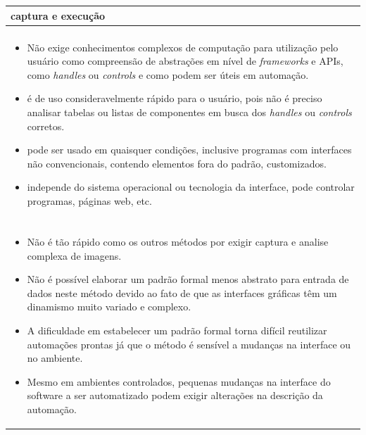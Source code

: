 \documentclass[tg]{mdtufsm}
\begin{document}
{                \begin{tabularx}{\textwidth}{|*{1}{>{\centering\arraybackslash}X}|}
                    \hline
                    captura e execução \\
                    \hline
                    {\bf prós:} \\
                    \begin{itemize}
                        \item Não exige conhecimentos complexos de computação para utilização pelo usuário como compreensão de abstrações em nível de \emph{frameworks} e APIs, como \emph{handles} ou \emph{controls} e como podem ser úteis em automação.
                        \item é de uso consideravelmente rápido para o usuário, pois não é preciso analisar tabelas ou listas de componentes em busca dos \emph{handles} ou \emph{controls} corretos.
                        \item pode ser usado em quaisquer condições, inclusive programas com interfaces não convencionais, contendo elementos fora do padrão, customizados.
                        \item independe do sistema operacional ou tecnologia da interface, pode controlar programas, páginas web, etc.
                    \end{itemize}
                    \\ {\bf contras:} \\
                    \begin{itemize}
                        \item Não é tão rápido como os outros métodos por exigir captura e analise complexa de imagens.
                        \item Não é possível elaborar um padrão formal menos abstrato para entrada de dados neste método devido ao fato de que as interfaces gráficas têm um dinamismo muito variado e complexo.
                        \item A dificuldade em estabelecer um padrão formal torna difícil reutilizar automações prontas já que o método é sensível a mudanças na interface ou no ambiente.
                        \item Mesmo em ambientes controlados, pequenas mudanças na interface do software a ser automatizado podem exigir alterações na descrição da automação.
                    \end{itemize}
                    \\ \hline
                \end{tabularx}
                }
\end{document}
